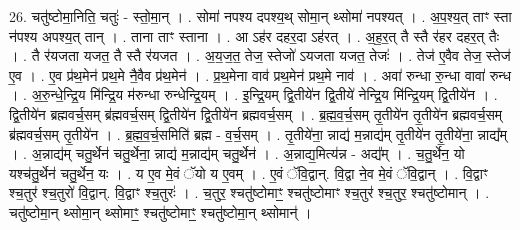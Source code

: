 \documentclass[17pt]{extarticle}
\begin{document}
26. चतु॑ष्टोमा॒निति॒ चतुः॑ - स्तो॒मा॒न् । . सोमा॑ नपश्य दपश्य॒थ् सोमा॒न् थ्सोमा॑ नपश्यत् । . अ॒प॒श्य॒त् ताꣳ स्ता न॑पश्य अपश्य॒त् तान् । . ताना ताꣳ स्ताना । . आ ऽह॑र दहर॒दा ऽह॑रत् । . अ॒ह॒र॒त् तै स्तै र॑हर दहर॒त् तैः । . तै र॑यजता यजत॒ तै स्तै र॑यजत । . अ॒य॒ज॒त॒ तेज॒ स्तेजो॑ ऽयजता यजत॒ तेजः॑ । . तेज॑ ए॒वैव तेज॒ स्तेज॑ ए॒व । . ए॒व प्र॑थ॒मेन॑ प्रथ॒मे नै॒वैव प्र॑थ॒मेन॑ । . प्र॒थ॒मेना वाव॑ प्रथ॒मेन॑ प्रथ॒मे नाव॑ । . अवा॑ रुन्धा रु॒न्धा वावा॑ रुन्ध । . अ॒रु॒न्धे॒न्द्रि॒य मि॑न्द्रि॒य म॑रुन्धा रुन्धेन्द्रि॒यम् । . इ॒न्द्रि॒यम् द्वि॒तीये॑न द्वि॒तीये॑ नेन्द्रि॒य मि॑न्द्रि॒यम् द्वि॒तीये॑न । . द्वि॒तीये॑न ब्रह्मवर्च॒सम् ब्र॑ह्मवर्च॒सम् द्वि॒तीये॑न द्वि॒तीये॑न ब्रह्मवर्च॒सम् । . ब्र॒ह्म॒व॒र्च॒सम् तृ॒तीये॑न तृ॒तीये॑न ब्रह्मवर्च॒सम् ब्र॑ह्मवर्च॒सम् तृ॒तीये॑न । . ब्र॒ह्म॒व॒र्च॒समिति॑ ब्रह्म - व॒र्च॒सम् । . तृ॒तीये॑ना॒ न्नाद्य॑ म॒न्नाद्य॑म् तृ॒तीये॑न तृ॒तीये॑ना॒ न्नाद्य᳚म् । . अ॒न्नाद्य॑म् चतु॒र्थेन॑ चतु॒र्थेना॒ न्नाद्य॑ म॒न्नाद्य॑म् चतु॒र्थेन॑ । . अ॒न्नाद्य॒मित्य॑न्न - अद्य᳚म् । . च॒तु॒र्थेन॒ यो यश्च॑तु॒र्थेन॑ चतु॒र्थेन॒ यः । . य ए॒व मे॒वं ॅयो य ए॒वम् । . ए॒वं ॅवि॒द्वान्. वि॒द्वा ने॒व मे॒वं ॅवि॒द्वान् । . वि॒द्वाꣳ श्च॒तुर॑ श्च॒तुरो॑ वि॒द्वान्. वि॒द्वाꣳ श्च॒तुरः॑ । . च॒तुर॒ श्चतु॑ष्टोमाꣳ॒॒ श्चतु॑ष्टोमाꣳ श्च॒तुर॑ श्च॒तुर॒ श्चतु॑ष्टोमान् । . चतु॑ष्टोमा॒न् थ्सोमा॒न् थ्सोमाꣳ॒॒ श्चतु॑ष्टोमाꣳ॒॒ श्चतु॑ष्टोमा॒न् थ्सोमान्॑ । \newline
\end{document}
